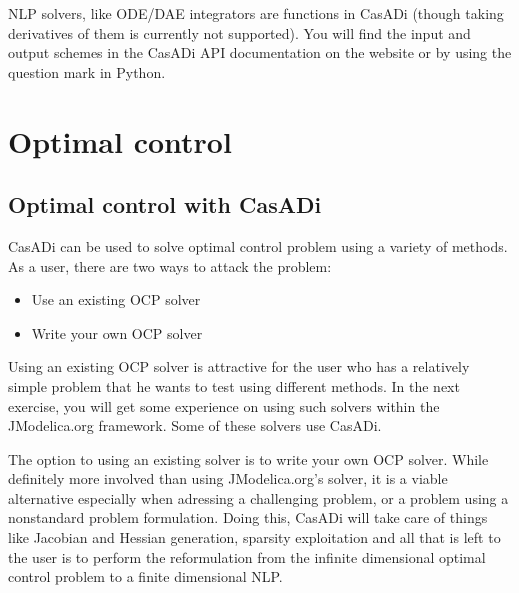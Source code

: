 \documentclass[a4paper,12pt]{book}
\begin{document}
{NLP solvers, like ODE/DAE integrators are functions in CasADi (though taking derivatives of them is currently not supported). You will find the input and output schemes in the CasADi API documentation on the website or by using the question mark in Python.

\chapter{Optimal control}

\section{Optimal control with CasADi}
CasADi can be used to solve optimal control problem using a variety of methods. As a user, there are two ways to attack the problem:
\begin{itemize}
  \item Use an existing OCP solver
  \item Write your own OCP solver
\end{itemize}

Using an existing OCP solver is attractive for the user who has a relatively simple problem that he wants to test using different methods. In the next exercise, you will get some experience on using such solvers within the JModelica.org framework. Some of these solvers use CasADi.

The option to using an existing solver is to write your own OCP solver. While definitely more involved than using JModelica.org's solver, it is a viable alternative especially when adressing a challenging problem, or a problem using a nonstandard problem formulation. Doing this,   CasADi will take care of things like Jacobian and Hessian generation, sparsity exploitation and all that is left to the user is to perform the reformulation from the infinite dimensional optimal control problem to a finite dimensional NLP.

}
\end{document}
